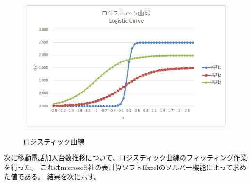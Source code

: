\documentclass[uplatex, titlepage]{jsarticle}
\begin{document}
\begin{figure}[H]
\begin{tabular}{c}
\begin{minipage}{0.5\hsize}
          \includegraphics[scale = 0.9]{re2/f8.png}
          \caption{ロジスティック曲線}
        \label{fig:graphicx4}
      \end{minipage}
  \end{tabular}
\end{figure}


次に移動電話加入台数推移について、ロジスティック曲線のフィッティング作業を行った。
これはmicrosoft社の表計算ソフトExcelのソルバー機能によって求めた値である。
結果を次に示す。
\end{document}

